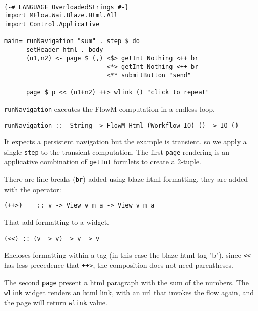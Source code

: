 \documentclass{tmr}
\begin{document}
 
 
{\tt 
 
\begin{verbatim} 
 
{-# LANGUAGE OverloadedStrings #-} 
import MFlow.Wai.Blaze.Html.All 
import Control.Applicative 
 
main= runNavigation "sum" . step $ do 
      setHeader html . body 
      (n1,n2) <- page $ (,) <$> getInt Nothing <++ br 
                            <*> getInt Nothing <++ br 
                            <** submitButton "send" 
 
      page $ p << (n1+n2) ++> wlink () "click to repeat" 
\end{verbatim} 
 
} 
 
{\tt runNavigation} executes the FlowM computation in a endless loop. 
 
{\tt 
 
\begin{verbatim} 
runNavigation ::  String -> FlowM Html (Workflow IO) () -> IO () 
\end{verbatim} 
 
} 
It expects a persistent navigation but the example is transient, so we apply a single {\tt step} to the transient computation. The first {\tt page} rendering is an applicative combination of {\tt getInt} formlets to create a 2-tuple. 

There are line breaks ({\tt br}) added using blaze-html formatting. they are added with the operator: 
 
{\tt 
 
\begin{verbatim} 
(++>)    :: v -> View v m a -> View v m a 
\end{verbatim} 
 
} 
 
That add formatting to a widget.

{\tt 
 
\begin{verbatim} 
(<<) :: (v -> v) -> v -> v
\end{verbatim} 
 
} 
Encloses formatting within a tag (in this case the blaze-html tag "b").  since {\tt <<} has less precedence that {\tt ++>}, the composition does not need parentheses.
 
The second {\tt page} present a html paragraph with the sum of the 
numbers. The {\tt wlink} widget renders an html link, with an url that invokes the flow again, and the page will return {\tt wlink} value.
 
\end{document}
